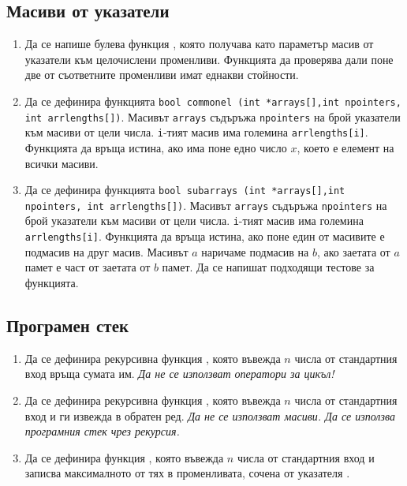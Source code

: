 {\subsection {Масиви от указатели}
\begin{enumerate}[resume]
  \item Да се напише булева функция , която получава като параметър масив  от указатели към целочислени променливи. Функцията да проверява дали поне две от съответните променливи имат еднакви стойности.
  \item Да се дефинира функцията  \texttt{bool commonel (int *arrays[],int npointers, int arrlengths[])}. Масивът \texttt{arrays} съдъръжа \texttt{npointers} на брой указатели към масиви от цели числа. \texttt{i}-тият масив има големина \texttt{arrlengths[i]}. Функцията да връща истина, ако има поне едно число $x$, което е елемент на всички масиви.
  \item Да се дефинира функцията \texttt{bool subarrays (int *arrays[],int npointers, int arrlengths[])}. Масивът \texttt{arrays} съдъръжа \texttt{npointers} на брой указатели към масиви от цели числа. \texttt{i}-тият масив има големина \texttt{arrlengths[i]}. Функцията да връща истина, ако поне един от масивите е подмасив на друг масив. Масивът $a$ наричаме подмасив на $b$, ако заетата от $a$ памет е част от заетата от $b$ памет. Да се напишат подходящи тестове за функцията.
\end{enumerate}

\subsection {Програмен стек}
\begin{enumerate}[resume]
  \item Да се дефинира рекурсивна функция , която въвежда $n$ числа от стандартния вход връща сумата им. \emph{Да не се използват оператори за цикъл!}

  \item Да се дефинира рекурсивна функция , която въвежда $n$ числа от стандартния вход и ги извежда в обратен ред. \emph{Да не се използват масиви. Да се използва програмния стек чрез рекурсия.}

  \item Да се дефинира функция , която въвежда $n$ числа от стандартния вход и записва максималното от тях в променливата, сочена от указателя .


\end{enumerate}}
